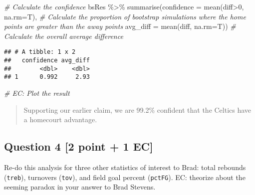 \documentclass[
]{article}
\newenvironment{Shaded}{\begin{snugshade}}{\end{snugshade}}
\newcommand{\AttributeTok}[1]{\textcolor[rgb]{0.77,0.63,0.00}{#1}}
\newcommand{\CommentTok}[1]{\textcolor[rgb]{0.56,0.35,0.01}{\textit{#1}}}
\newcommand{\DecValTok}[1]{\textcolor[rgb]{0.00,0.00,0.81}{#1}}
\newcommand{\FunctionTok}[1]{\textcolor[rgb]{0.00,0.00,0.00}{#1}}
\newcommand{\NormalTok}[1]{#1}
\newcommand{\SpecialCharTok}[1]{\textcolor[rgb]{0.00,0.00,0.00}{#1}}
\begin{document}
\begin{Shaded}
\begin{Highlighting}[]
\CommentTok{\# Calculate the confidence}
\NormalTok{bsRes }\SpecialCharTok{\%\textgreater{}\%}
  \FunctionTok{summarise}\NormalTok{(}\AttributeTok{confidence =} \FunctionTok{mean}\NormalTok{(diff}\SpecialCharTok{\textgreater{}}\DecValTok{0}\NormalTok{, }\AttributeTok{na.rm=}\NormalTok{T), }\CommentTok{\# Calculate the proportion of bootstrap simulations where the home points are greater than the away points}
            \AttributeTok{avg\_diff =} \FunctionTok{mean}\NormalTok{(diff, }\AttributeTok{na.rm=}\NormalTok{T)) }\CommentTok{\# Calculate the overall average difference}
\end{Highlighting}
\end{Shaded}

\begin{verbatim}
## # A tibble: 1 x 2
##   confidence avg_diff
##        <dbl>    <dbl>
## 1      0.992     2.93
\end{verbatim}

\begin{Shaded}
\begin{Highlighting}[]
\CommentTok{\# EC: Plot the result}
\end{Highlighting}
\end{Shaded}

\begin{quote}
Supporting our earlier claim, we are 99.2\% confident that the Celtics
have a homecourt advantage.
\end{quote}

\hypertarget{question-4-2-point-1-ec}{%
\subsection{Question 4 {[}2 point + 1
EC{]}}\label{question-4-2-point-1-ec}}

Re-do this analysis for three other statistics of interest to Brad:
total rebounds (\texttt{treb}), turnovers (\texttt{tov}), and field goal
percent (\texttt{pctFG}). EC: theorize about the seeming paradox in your
answer to Brad Stevens.
\end{document}
